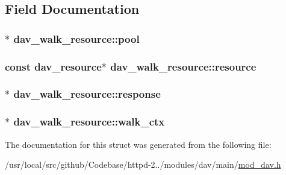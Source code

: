 \subsection{Field Documentation}
\subsubsection[{\texorpdfstring{pool}{pool}}]{$\ast$ dav\+\_\+walk\+\_\+resource\+::pool}\hypertarget{structdav__walk__resource_a6ed413a33aea84076935230a22fd023a}{}\label{structdav__walk__resource_a6ed413a33aea84076935230a22fd023a}
\subsubsection[{\texorpdfstring{resource}{resource}}]{\setlength{\rightskip}{0pt plus 5cm}const {\bf dav\+\_\+resource}$\ast$ dav\+\_\+walk\+\_\+resource\+::resource}\hypertarget{structdav__walk__resource_a6465f355fb5235ed70cd5a0c82e4f2de}{}\label{structdav__walk__resource_a6465f355fb5235ed70cd5a0c82e4f2de}
\subsubsection[{\texorpdfstring{response}{response}}]{$\ast$ dav\+\_\+walk\+\_\+resource\+::response}\hypertarget{structdav__walk__resource_a3c28cb22a7eae9cbe00fd6916a690407}{}\label{structdav__walk__resource_a3c28cb22a7eae9cbe00fd6916a690407}
\subsubsection[{\texorpdfstring{walk\+\_\+ctx}{walk_ctx}}]{$\ast$ dav\+\_\+walk\+\_\+resource\+::walk\+\_\+ctx}\hypertarget{structdav__walk__resource_aa34c3e02290f19435b455136d2d90720}{}\label{structdav__walk__resource_aa34c3e02290f19435b455136d2d90720}


The documentation for this struct was generated from the following file\+:\begin{DoxyCompactItemize}
\item 
/usr/local/src/github/\+Codebase/httpd-\/2../modules/dav/main/\hyperlink{mod__dav_8h}{mod\+\_\+dav.\+h}\end{DoxyCompactItemize}
